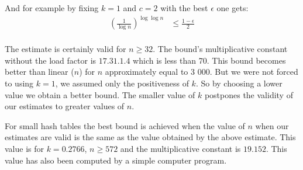 And for example by fixing $k = 1$ and $c = 2$ with the best $\epsilon$ one gets:
\begin{displaymath}
\begin{split}
\left(\frac{1}{\log n}\right)^{\log \log n} & \leq \frac{1 - \epsilon}{2} \\
\end{split}
\end{displaymath}

The estimate is certainly valid for $n \geq 32$. The bound's multiplicative constant without the load factor is $17.31 . 1 . 4$ which is less than 70. This bound becomes better than linear ($n$) for $n$ approximately equal to 3 000. But we were not forced to using $k = 1$, we assumed only the positiveness of $k$. So by choosing a lower value we obtain a better bound. The smaller value of $k$ postpones the validity of our estimates to greater values of $n$.

For small hash tables the best bound is achieved when the value of $n$ when our estimates are valid is the same as the value obtained by the above estimate. This value is for $k = 0.2766$, $n \geq 572$ and the multiplicative constant is $19.152$. This value has also been computed by a simple computer program.
